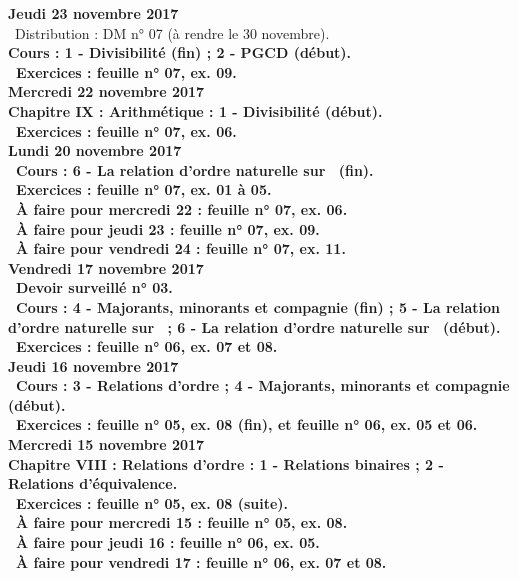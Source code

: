 \documentclass[12pt,a4paper]{article}
\begin{document}
\noindent\textbf{Jeudi 23 novembre 2017}\\
\bu\ Distribution : DM n° 07 (à rendre le 30 novembre).\\
\bf Cours : 1 - Divisibilité (fin) ; 2 - PGCD (début).\\
\bu\ Exercices : feuille n° 07, ex. 09.\\

\noindent\textbf{\bf Mercredi 22 novembre 2017}\\
\bf Chapitre IX \rm : Arithmétique : 1 - Divisibilité (début).\\
\bu\ Exercices : feuille n° 07, ex. 06.\\

\noindent\textbf{Lundi 20 novembre 2017}\\
 \bu\ Cours : 6 - La relation d'ordre naturelle sur \R\ (fin).\\
\bu\ Exercices : feuille n° 07, ex. 01 à 05.\\
\bu\ À faire pour mercredi 22 : feuille n° 07, ex. 06.\\
\bu\ À faire pour jeudi 23 : feuille n° 07, ex. 09.\\
\bu\ À faire pour vendredi 24 : feuille n° 07, ex. 11.\vspace{.4cm}\\

\noindent\textbf{Vendredi 17 novembre 2017}\\
\bu\ Devoir surveillé n° 03.\\
 \bu\ Cours : 4 - Majorants, minorants et compagnie (fin) ; 5 - La relation d'ordre naturelle sur \N\ ; 
 6 - La relation d'ordre naturelle sur \R\ (début).\\
\bu\ Exercices : feuille n° 06, ex. 07 et 08.\vspace{.4cm}\\

\noindent\textbf{Jeudi 16 novembre 2017}\\
 \bu\ Cours : 3 - Relations d'ordre ;  4 - Majorants, minorants et compagnie (début).\\
\bu\ Exercices : feuille n° 05, ex. 08 (fin), et feuille n° 06, ex. 05 et 06.\vspace{.4cm}\\

\noindent\textbf{\bf Mercredi 15 novembre 2017}\\
\bf Chapitre VIII \rm : Relations d'ordre : 1 - Relations binaires ; 2 - Relations d'équivalence.\\
\bu\ Exercices : feuille n° 05, ex. 08 (suite).\\
\bu\ À faire pour mercredi 15 : feuille n° 05, ex. 08.\\
\bu\ À faire pour jeudi 16 : feuille n° 06, ex. 05.\\
\bu\ À faire pour vendredi 17 : feuille n° 06, ex. 07 et 08.\vspace{.4cm}\\
\end{document}
